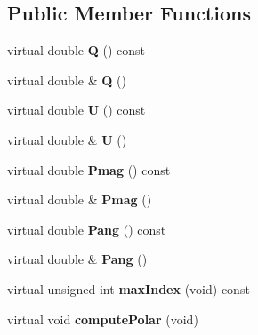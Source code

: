 \subsection*{Public Member Functions}
\begin{DoxyCompactItemize}
\item 
\hypertarget{classTPPixel_a2d5023462c35efd9acd6d9853be30229}{
virtual double {\bfseries Q} () const }
\label{classTPPixel_a2d5023462c35efd9acd6d9853be30229}

\item 
\hypertarget{classTPPixel_a7bca84ad3bec72f7643efca4fb784dbd}{
virtual double \& {\bfseries Q} ()}
\label{classTPPixel_a7bca84ad3bec72f7643efca4fb784dbd}

\item 
\hypertarget{classTPPixel_af0f9ad8a8fd2528103dd11731ae2ac86}{
virtual double {\bfseries U} () const }
\label{classTPPixel_af0f9ad8a8fd2528103dd11731ae2ac86}

\item 
\hypertarget{classTPPixel_a6ab8bf7d705e0acc73815b33a06ea737}{
virtual double \& {\bfseries U} ()}
\label{classTPPixel_a6ab8bf7d705e0acc73815b33a06ea737}

\item 
\hypertarget{classTPPixel_a062ddf05eea814befdc2e5dfa1362685}{
virtual double {\bfseries Pmag} () const }
\label{classTPPixel_a062ddf05eea814befdc2e5dfa1362685}

\item 
\hypertarget{classTPPixel_abca355a520af6a8e9d63b0b88e190085}{
virtual double \& {\bfseries Pmag} ()}
\label{classTPPixel_abca355a520af6a8e9d63b0b88e190085}

\item 
\hypertarget{classTPPixel_a3663c49f62915c3d1bf9c2b1771e1610}{
virtual double {\bfseries Pang} () const }
\label{classTPPixel_a3663c49f62915c3d1bf9c2b1771e1610}

\item 
\hypertarget{classTPPixel_ac7b11328041d3855a4f98f3940a981c2}{
virtual double \& {\bfseries Pang} ()}
\label{classTPPixel_ac7b11328041d3855a4f98f3940a981c2}

\item 
\hypertarget{classTPPixel_a40d8f0435d285f06235bcd789bda8515}{
virtual unsigned int {\bfseries maxIndex} (void) const }
\label{classTPPixel_a40d8f0435d285f06235bcd789bda8515}

\item 
\hypertarget{classTPPixel_a8a7e163a3994ddf3df1ed55e01a764e2}{
virtual void {\bfseries computePolar} (void)}
\label{classTPPixel_a8a7e163a3994ddf3df1ed55e01a764e2}

\end{DoxyCompactItemize}
